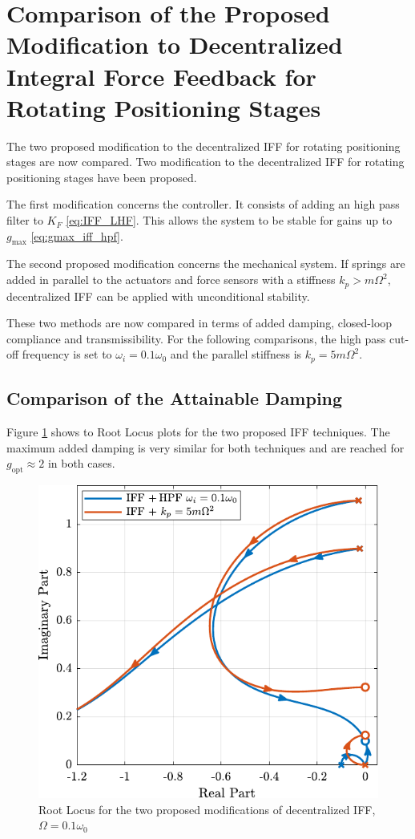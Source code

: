 \documentclass{ISMA_USD2020}
\begin{document}
\section{Comparison of the Proposed Modification to Decentralized Integral Force Feedback for Rotating Positioning Stages}
\label{sec:orga5dc79a}
\label{sec:comparison}
The two proposed modification to the decentralized IFF for rotating positioning stages are now compared.
Two modification to the decentralized IFF for rotating positioning stages have been proposed.

The first modification concerns the controller.
It consists of adding an high pass filter to \(K_F\) \eqref{eq:IFF_LHF}.
This allows the system to be stable for gains up to \(g_\text{max}\) \eqref{eq:gmax_iff_hpf}.

The second proposed modification concerns the mechanical system.
If springs are added in parallel to the actuators and force sensors with a stiffness \(k_p > m \Omega^2\), decentralized IFF can be applied with unconditional stability.

These two methods are now compared in terms of added damping, closed-loop compliance and transmissibility.
For the following comparisons, the high pass cut-off frequency is set to \(\omega_i = 0.1 \omega_0\) and the parallel stiffness is \(k_p = 5 m \Omega^2\).
\subsection{Comparison of the Attainable Damping}
\label{sec:org6e1b03e}
Figure \ref{fig:comp_root_locus} shows to Root Locus plots for the two proposed IFF techniques.
The maximum added damping is very similar for both techniques and are reached for \(g_\text{opt} \approx 2\) in both cases.

\begin{figure}[htbp]
\centering
\includegraphics[scale=1]{figs/comp_root_locus.pdf}
\caption{\label{fig:comp_root_locus}Root Locus for the two proposed modifications of decentralized IFF, \(\Omega = 0.1 \omega_0\)}
\end{figure}
\end{document}
